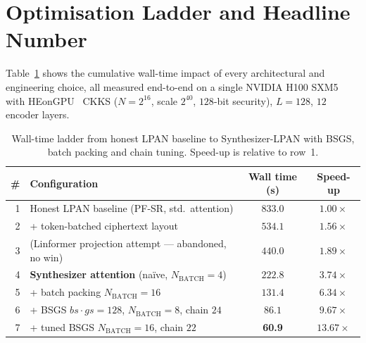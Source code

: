 \documentclass[11pt,a4paper]{article}
\newcommand{\Bbatch}{N_{\mathrm{BATCH}}}
\begin{document}
\section{Optimisation Ladder and Headline Number}

Table~\ref{tab:ladder} shows the cumulative wall-time impact of every
architectural and engineering choice, all measured end-to-end on a
single NVIDIA H100 SXM5 with HEonGPU~\cite{heongpu2024} CKKS
($N=2^{16}$, scale $2^{40}$, $128$-bit security), $L=128$, $12$ encoder
layers.

\begin{table}[h]
\centering
\caption{Wall-time ladder from honest LPAN baseline to Synthesizer-LPAN
         with BSGS, batch packing and chain tuning.  Speed-up is
         relative to row~1.}
\label{tab:ladder}
\begin{tabular}{rlcc}
\toprule
\# & \textbf{Configuration} & \textbf{Wall time (s)} & \textbf{Speed-up} \\
\midrule
1 & Honest LPAN baseline (PF-SR, std.\ attention)             & $833.0$ & $1.00\times$ \\
2 & + token-batched ciphertext layout                          & $534.1$ & $1.56\times$ \\
3 & (Linformer projection attempt --- abandoned, no win)       & $440.0$ & $1.89\times$ \\
4 & \textbf{Synthesizer attention} (na\"ive, $\Bbatch{=}4$)     & $222.8$ & $3.74\times$ \\
5 & \quad+ batch packing $\Bbatch{=}16$                         & $131.4$ & $6.34\times$ \\
6 & \quad+ BSGS $bs\cdot gs{=}128$, $\Bbatch{=}8$, chain $24$   & $86.1$  & $9.67\times$ \\
7 & \quad+ tuned BSGS $\Bbatch{=}16$, chain $22$                & \textbf{60.9} & $\mathbf{13.67\times}$ \\
\bottomrule
\end{tabular}
\end{table}
\end{document}

